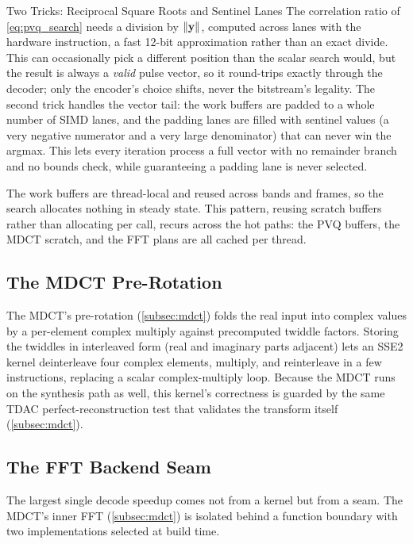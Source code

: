 \begin{concept}{Two Tricks: Reciprocal Square Roots and Sentinel Lanes}
  The correlation ratio of \cref{eq:pvq_search} needs a division by
  $\lVert\mathbf{y}\rVert$, computed across lanes with the hardware
   instruction, a fast 12-bit approximation
  rather than an exact divide. This can occasionally pick a different position
  than the scalar search would, but the result is always a \emph{valid} pulse
  vector, so it round-trips exactly through the decoder; only the
  encoder's choice
  shifts, never the bitstream's legality. The second trick handles the vector
  tail: the work buffers are padded to a whole number of SIMD lanes, and the
  padding lanes are filled with sentinel values (a very negative numerator and a
  very large denominator) that can never win the argmax. This lets every
  iteration process a full vector with no remainder branch and no bounds check,
  while guaranteeing a padding lane is never selected.
\end{concept}

The work buffers are thread-local and reused across bands and frames, so the
search allocates nothing in steady state. This pattern, reusing scratch buffers
rather than allocating per call, recurs across the hot paths: the PVQ
buffers, the
MDCT scratch, and the FFT plans are all cached per thread.

\subsection{The MDCT Pre-Rotation}\label{subsec:simd_mdct}

The MDCT's pre-rotation (\cref{subsec:mdct}) folds the real input into complex
values by a per-element complex multiply against precomputed twiddle factors.
Storing the twiddles in  interleaved form (real and imaginary
parts adjacent) lets an SSE2 kernel deinterleave four complex
elements, multiply,
and reinterleave in a few instructions, replacing a scalar
complex-multiply loop.
Because the MDCT runs on the synthesis path as well, this kernel's
correctness is
guarded by the same TDAC perfect-reconstruction test that validates
the transform
itself (\cref{subsec:mdct}).

\subsection{The FFT Backend Seam}\label{subsec:fft_seam}

The largest single decode speedup comes not from a kernel but from a seam. The
MDCT's inner FFT (\cref{subsec:mdct}) is isolated behind a function
boundary with
two implementations selected at build time.

